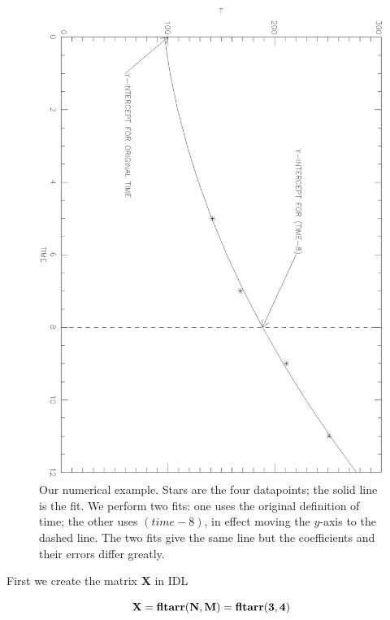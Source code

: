 \documentclass[psfig,preprint]{aastex}
\begin{document}
\begin{figure}[h!]
\begin{center}
\leavevmode
\includegraphics[scale=.55, angle=90]{lsfitfig.ps}
\end{center}
\caption{Our numerical example. Stars are the four datapoints; the solid
line is the fit. We perform two fits: one uses the original definition
of time; the other uses $(time-8)$, in effect moving the $y$-axis to the
dashed line. The two fits give the same line but the coefficients and
their errors differ greatly.\label{lsfitfig}}
\end{figure}

	First we create the matrix {\bf X} in IDL

\begin{equation}
{\bf X = fltarr(N,M) = fltarr(3,4)}
\end{equation}
	
\end{document}
